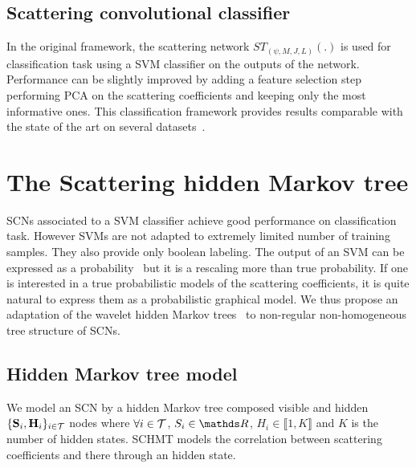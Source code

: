 \documentclass{article}
\begin{document}
  \subsection{Scattering convolutional classifier}
    \label{subsec:SCN/SCC}
  
		In the original framework, the scattering network $ST_{(\psi, M,J,L)}(.)$ is used for classification task using a SVM classifier on the outputs of the network. Performance can be slightly improved by adding a feature selection step performing PCA on the scattering coefficients and keeping only the most informative ones. This classification framework provides results comparable with the state of the art on several datasets~\citep{bruna}.
    
    



\section{The Scattering hidden Markov tree}
\label{sec:SCHMT}

  SCNs associated to a SVM classifier achieve good performance on classification task. However SVMs are not adapted to extremely limited number of training samples. They also provide only boolean labeling. The output of an SVM can be expressed as a probability~\citep{platt1999probabilistic} but it is a rescaling more than true probability. If one is interested in a true probabilistic models of the scattering coefficients, it is quite natural to express them as a probabilistic graphical model. We thus propose an adaptation of the wavelet hidden Markov trees~\citep{Crouse and Durand} to non-regular non-homogeneous tree structure of SCNs.
  
  \subsection{Hidden Markov tree model}
    \label{subsec:SCHMT/HMT model}
        
    We model an SCN by a hidden Markov tree composed visible and hidden $\{{\bf S}_{i} , {\bf H}_{i}\}_{i \in \mathcal{T}}$ nodes where $\forall i \in \mathcal{T}$, $S_{i} \in \dsR$, $H_{i} \in \llbracket 1,K \rrbracket$ and $K$ is the number of hidden states. SCHMT models the correlation between scattering coefficients and there  through an hidden state.
    
\end{document}
